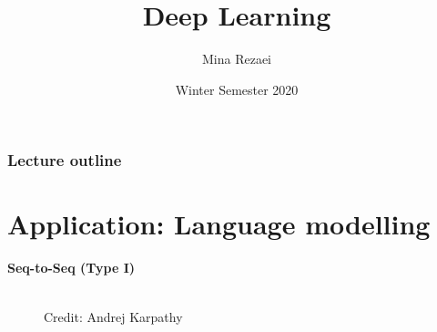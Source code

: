 \documentclass[11pt,compress,t,notes=noshow]{beamer}
\title{Deep Learning}
\author{Mina Rezaei}
\institute{Department of Statistics -- LMU Munich}
\date{Winter Semester 2020}
\begin{document}



\begin{frame}
\frametitle{Lecture outline}
\tableofcontents
\end{frame}

\section{Application: Language modelling}

%
%  


\begin{frame}

\vspace{15mm}
\hspace{25mm} \textbf{\LARGE{Seq-to-Seq (Type I)}}
\begin{figure}
      \centering
      \tiny{\\Credit: Andrej Karpathy}
  \end{figure}
  
\end{frame}
\end{document}
